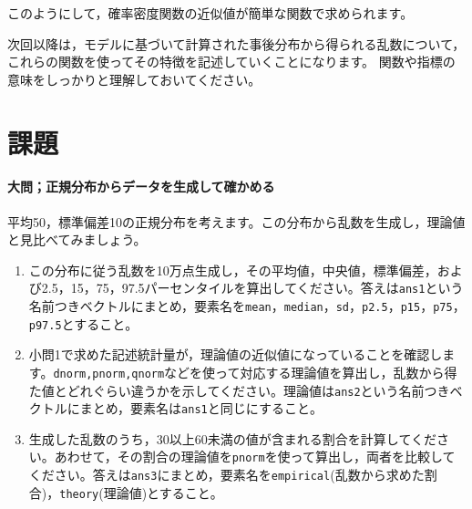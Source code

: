 \documentclass{ltjsbook}
\begin{document}
このようにして，確率密度関数の近似値が簡単な関数で求められます。

次回以降は，モデルに基づいて計算された事後分布から得られる乱数について，これらの関数を使ってその特徴を記述していくことになります。
関数や指標の意味をしっかりと理解しておいてください。
\section{課題}


\paragraph{大問；正規分布からデータを生成して確かめる}
平均50，標準偏差10の正規分布を考えます。この分布から乱数を生成し，理論値と見比べてみましょう。
\begin{enumerate}
	\item この分布に従う乱数を10万点生成し，その平均値，中央値，標準偏差，および2.5，15，75，97.5パーセンタイルを算出してください。答えは\verb|ans1|という名前つきベクトルにまとめ，要素名を\verb|mean|，\verb|median|，\verb|sd|，\verb|p2.5|，\verb|p15|，\verb|p75|，\verb|p97.5|とすること。
	\item 小問1で求めた記述統計量が，理論値の近似値になっていることを確認します。\texttt{dnorm,pnorm,qnorm}などを使って対応する理論値を算出し，乱数から得た値とどれぐらい違うかを示してください。理論値は\verb|ans2|という名前つきベクトルにまとめ，要素名は\verb|ans1|と同じにすること。
	\item 生成した乱数のうち，30以上60未満の値が含まれる割合を計算してください。あわせて，その割合の理論値を\texttt{pnorm}を使って算出し，両者を比較してください。答えは\verb|ans3|にまとめ，要素名を\verb|empirical|(乱数から求めた割合)，\verb|theory|(理論値)とすること。
\end{enumerate}
\end{document}

